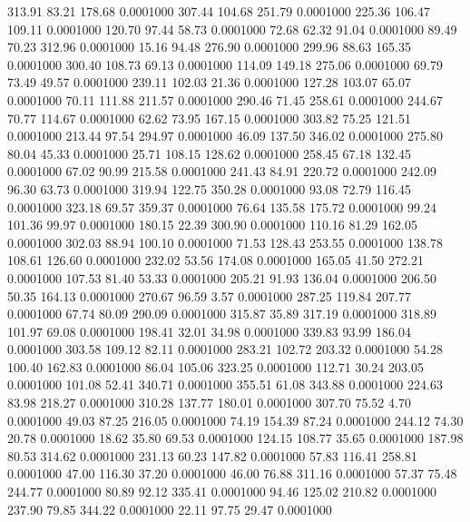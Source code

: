 313.91   83.21  178.68   0.0001000
 307.44  104.68  251.79   0.0001000
 225.36  106.47  109.11   0.0001000
 120.70   97.44   58.73   0.0001000
  72.68   62.32   91.04   0.0001000
  89.49   70.23  312.96   0.0001000
  15.16   94.48  276.90   0.0001000
 299.96   88.63  165.35   0.0001000
 300.40  108.73   69.13   0.0001000
 114.09  149.18  275.06   0.0001000
  69.79   73.49   49.57   0.0001000
 239.11  102.03   21.36   0.0001000
 127.28  103.07   65.07   0.0001000
  70.11  111.88  211.57   0.0001000
 290.46   71.45  258.61   0.0001000
 244.67   70.77  114.67   0.0001000
  62.62   73.95  167.15   0.0001000
 303.82   75.25  121.51   0.0001000
 213.44   97.54  294.97   0.0001000
  46.09  137.50  346.02   0.0001000
 275.80   80.04   45.33   0.0001000
  25.71  108.15  128.62   0.0001000
 258.45   67.18  132.45   0.0001000
  67.02   90.99  215.58   0.0001000
 241.43   84.91  220.72   0.0001000
 242.09   96.30   63.73   0.0001000
 319.94  122.75  350.28   0.0001000
  93.08   72.79  116.45   0.0001000
 323.18   69.57  359.37   0.0001000
  76.64  135.58  175.72   0.0001000
  99.24  101.36   99.97   0.0001000
 180.15   22.39  300.90   0.0001000
 110.16   81.29  162.05   0.0001000
 302.03   88.94  100.10   0.0001000
  71.53  128.43  253.55   0.0001000
 138.78  108.61  126.60   0.0001000
 232.02   53.56  174.08   0.0001000
 165.05   41.50  272.21   0.0001000
 107.53   81.40   53.33   0.0001000
 205.21   91.93  136.04   0.0001000
 206.50   50.35  164.13   0.0001000
 270.67   96.59    3.57   0.0001000
 287.25  119.84  207.77   0.0001000
  67.74   80.09  290.09   0.0001000
 315.87   35.89  317.19   0.0001000
 318.89  101.97   69.08   0.0001000
 198.41   32.01   34.98   0.0001000
 339.83   93.99  186.04   0.0001000
 303.58  109.12   82.11   0.0001000
 283.21  102.72  203.32   0.0001000
  54.28  100.40  162.83   0.0001000
  86.04  105.06  323.25   0.0001000
 112.71   30.24  203.05   0.0001000
 101.08   52.41  340.71   0.0001000
 355.51   61.08  343.88   0.0001000
 224.63   83.98  218.27   0.0001000
 310.28  137.77  180.01   0.0001000
 307.70   75.52    4.70   0.0001000
  49.03   87.25  216.05   0.0001000
  74.19  154.39   87.24   0.0001000
 244.12   74.30   20.78   0.0001000
  18.62   35.80   69.53   0.0001000
 124.15  108.77   35.65   0.0001000
 187.98   80.53  314.62   0.0001000
 231.13   60.23  147.82   0.0001000
  57.83  116.41  258.81   0.0001000
  47.00  116.30   37.20   0.0001000
  46.00   76.88  311.16   0.0001000
  57.37   75.48  244.77   0.0001000
  80.89   92.12  335.41   0.0001000
  94.46  125.02  210.82   0.0001000
 237.90   79.85  344.22   0.0001000
  22.11   97.75   29.47   0.0001000
